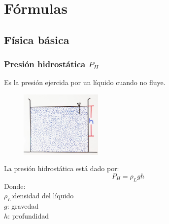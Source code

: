 \section{Fórmulas}
\subsection{Física básica}
\subsubsection{Presión hidrostática $P_H$}
Es la presión ejercida por un líquido cuando no fluye.
\begin{figure}[h]
    \centering
    \includegraphics[width=4cm]{images/presión-hidrosta.jpg}
    \label{fig:{presion_hidrostatica}}
\end{figure}

La presión hidrostática está dado por:
$$P_H=\rho_{L} g h$$
Donde:\\
    $\rho_{L}$:densidad del líquido\\
    $g$: gravedad\\
    $h$: profundidad
